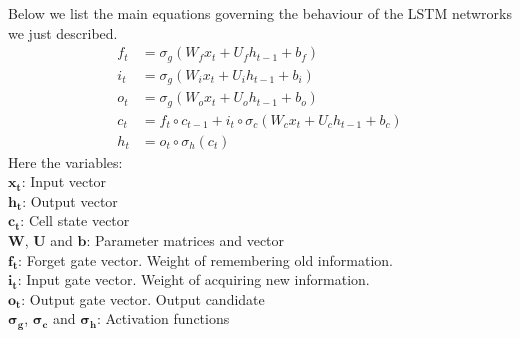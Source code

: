 \documentclass{article}
\begin{document}
				Below we list the main equations governing the behaviour of the LSTM netwrorks we just described.\\
				\begin{align}
					f_{t} &= \sigma_{g}(W_{f}x_{t} + U_{f}h_{t-1} + b_{f})\\	
					i_{t} &= \sigma_{g}(W_{i}x_{t} + U_{i}h_{t-1} + b_{i})\\
					o_{t} &= \sigma_{g}(W_{o}x_{t} + U_{o}h_{t-1} + b_{o})\\
					c_{t} &= f_{t} \circ c_{t-1} + i_{t} \circ \sigma_{c}(W_{c}x_{t} + U_{c}h_{t-1} + b_{c})\\
					h_{t} &= o_{t} \circ \sigma_{h}(c_{t})
				\end{align}
				Here the variables:\\
	$\mathbf{x_{t}}$: Input vector\\
    $\mathbf{h_{t}}$: Output vector\\
    $\mathbf{c_{t}}$: Cell state vector\\
    $\mathbf{W}$, $\mathbf{U}$ and $\mathbf{b}$: Parameter matrices and vector\\
    $\mathbf{f_{t}}$: Forget gate vector. Weight of remembering old information.\\
    $\mathbf{i_{t}}$: Input gate vector. Weight of acquiring new information.\\
    $\mathbf{o_{t}}$: Output gate vector. Output candidate\\
    $\mathbf{\sigma_{g}}$, $\mathbf{\sigma_{c}}$ and $\mathbf{\sigma_{h}}$: Activation functions\\
				
\end{document}

